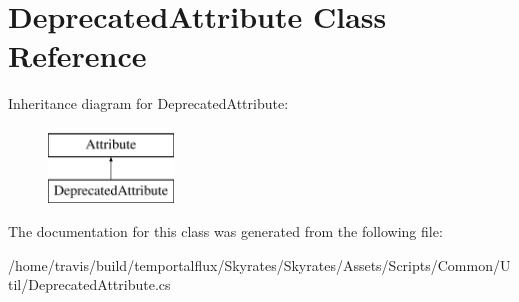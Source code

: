 \hypertarget{class_deprecated_attribute}{\section{Deprecated\-Attribute Class Reference}
\label{class_deprecated_attribute}
}
Inheritance diagram for Deprecated\-Attribute\-:\begin{figure}[H]
\begin{center}
\leavevmode
\includegraphics[height=2.000000cm]{class_deprecated_attribute}
\end{center}
\end{figure}


The documentation for this class was generated from the following file\-:\begin{DoxyCompactItemize}
\item 
/home/travis/build/temportalflux/\-Skyrates/\-Skyrates/\-Assets/\-Scripts/\-Common/\-Util/Deprecated\-Attribute.\-cs\end{DoxyCompactItemize}
